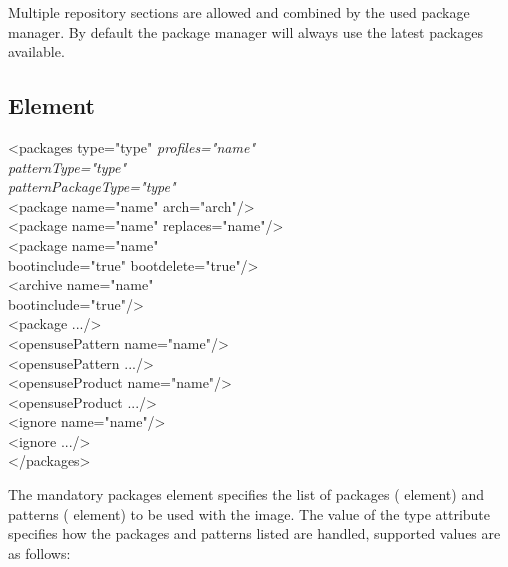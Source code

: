 Multiple repository sections are allowed and combined by the
used package manager. By default the package manager will always use
the latest packages available.

\subsection{ Element}
\begin{Command}{12cm}
<packages type="type" \textit{profiles="name"}\\
\hspace*{2.5cm}\textit{patternType="type"}\\
\hspace*{2.5cm}\textit{patternPackageType="type"}\\
\hspace*{1cm}<package name="name" arch="arch"/>\\
\hspace*{1cm}<package name="name" replaces="name"/>\\
\hspace*{1cm}<package name="name"\\
\hspace*{2.5cm}bootinclude="true" bootdelete="true"/>\\
\hspace*{1cm}<archive name="name"\\
\hspace*{2.5cm}bootinclude="true"/>\\
\hspace*{1cm}<package .../>\\
\hspace*{1cm}<opensusePattern name="name"/>\\
\hspace*{1cm}<opensusePattern .../>\\
\hspace*{1cm}<opensuseProduct name="name"/>\\
\hspace*{1cm}<opensuseProduct .../>\\
\hspace*{1cm}<ignore name="name"/>\\
\hspace*{1cm}<ignore .../>\\
</packages>
\end{Command}

The mandatory packages element specifies the list of packages ( 
element) and patterns ( element) to be used with the image.
The value of the type attribute specifies how the packages and patterns 
listed are handled, supported values are as follows:


